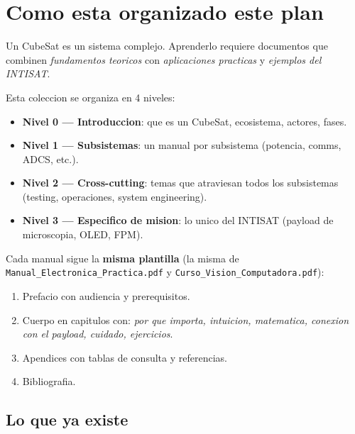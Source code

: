 \documentclass[11pt,a4paper,oneside]{report}
\begin{document}
\chapter{Como esta organizado este plan}

Un CubeSat es un sistema complejo. Aprenderlo requiere documentos que
combinen \emph{fundamentos teoricos} con \emph{aplicaciones practicas} y
\emph{ejemplos del INTISAT}.

Esta coleccion se organiza en 4 niveles:

\begin{itemize}[leftmargin=2em]
  \item \textbf{Nivel 0 --- Introduccion}: que es un CubeSat, ecosistema,
        actores, fases.
  \item \textbf{Nivel 1 --- Subsistemas}: un manual por subsistema (potencia,
        comms, ADCS, etc.).
  \item \textbf{Nivel 2 --- Cross-cutting}: temas que atraviesan todos los
        subsistemas (testing, operaciones, system engineering).
  \item \textbf{Nivel 3 --- Especifico de mision}: lo unico del INTISAT
        (payload de microscopia, OLED, FPM).
\end{itemize}

Cada manual sigue la \textbf{misma plantilla} (la misma de
\texttt{Manual\_Electronica\_Practica.pdf} y \texttt{Curso\_Vision\_Computadora.pdf}):

\begin{enumerate}[leftmargin=2em]
  \item Prefacio con audiencia y prerequisitos.
  \item Cuerpo en capitulos con: \emph{por que importa, intuicion, matematica,
        conexion con el payload, cuidado, ejercicios}.
  \item Apendices con tablas de consulta y referencias.
  \item Bibliografia.
\end{enumerate}

\section{Lo que ya existe}
\end{document}
